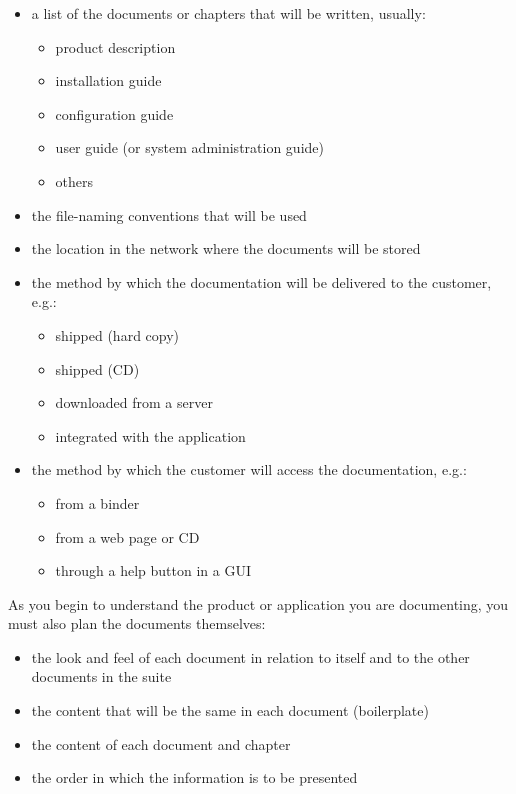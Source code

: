\documentclass[12pt]{article}
\begin{document}
\begin{itemize} \itemsep -2pt
	\item a list of the documents or chapters that will be written, usually:
		\begin{itemize} \itemsep -2pt
			\item product description
			\item installation guide
			\item configuration guide
			\item user guide (or system administration guide)
			\item others
		\end{itemize}
	\item the file-naming conventions that will be used
	\item the location in the network where the documents will be stored
	\item the method by which the documentation will be delivered to the customer, e.g.:
	  \begin{itemize} \itemsep -2pt
	  	\item shipped (hard copy)
	  	\item shipped (CD)
	  	\item downloaded from a server
	  	\item integrated with the application
	  \end{itemize}
	\item the method by which the customer will access the documentation, e.g.:
	  \begin{itemize} \itemsep -2pt
		  \item from a binder
  		\item from a web page or CD
  		\item through a help button in a GUI
		\end{itemize}
\end{itemize}

As you begin to understand the product or application you are documenting, you must also plan the documents themselves:

\begin{itemize} \itemsep -2pt
	\item the look and feel of each document in relation to itself and to the   other documents in the suite
	\item the content that will be the same in each document (boilerplate)
	\item the content of each document and chapter
	\item the order in which the information is to be presented
\end{itemize}
\end{document}
